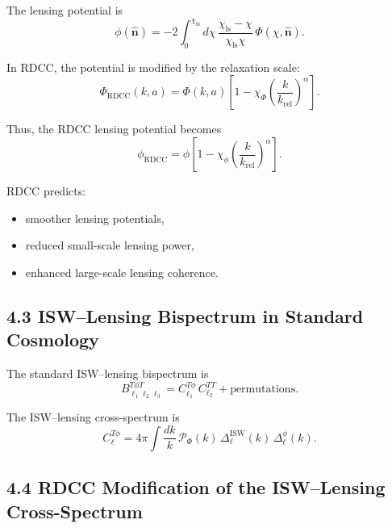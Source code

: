 \documentclass[11pt,a4paper]{article}
\begin{document}
The lensing potential is
\begin{equation}
    \phi(\hat{\mathbf{n}})
    = -2 \int_{0}^{\chi_{\mathrm{ls}}} d\chi\,
      \frac{\chi_{\mathrm{ls}}-\chi}{\chi_{\mathrm{ls}}\chi}\,
      \Phi(\chi,\hat{\mathbf{n}}).
\end{equation}

In RDCC, the potential is modified by the relaxation scale:
\begin{equation}
    \Phi_{\mathrm{RDCC}}(k,a)
    = \Phi(k,a)
      \left[
        1 - \chi_{\Phi}
        \left(\frac{k}{k_{\mathrm{rel}}}\right)^{\alpha}
      \right].
\end{equation}

Thus, the RDCC lensing potential becomes
\begin{equation}
    \phi_{\mathrm{RDCC}}
    = \phi
      \left[
        1 - \chi_{\phi}
        \left(\frac{k}{k_{\mathrm{rel}}}\right)^{\alpha}
      \right].
\end{equation}

RDCC predicts:

\begin{itemize}
    \item smoother lensing potentials,
    \item reduced small-scale lensing power,
    \item enhanced large-scale lensing coherence.
\end{itemize}

\subsection*{4.3 ISW–Lensing Bispectrum in Standard Cosmology}

The standard ISW–lensing bispectrum is
\begin{equation}
    B_{\ell_{1}\ell_{2}\ell_{3}}^{T\phi T}
    = C_{\ell_{1}}^{T\phi}\,C_{\ell_{2}}^{TT}
      + \text{permutations}.
\end{equation}

The ISW–lensing cross-spectrum is
\begin{equation}
    C_{\ell}^{T\phi}
    = 4\pi \int \frac{dk}{k}\,
      \mathcal{P}_{\Phi}(k)\,
      \Delta_{\ell}^{\mathrm{ISW}}(k)\,
      \Delta_{\ell}^{\phi}(k).
\end{equation}

\subsection*{4.4 RDCC Modification of the ISW–Lensing Cross-Spectrum}
\end{document}
